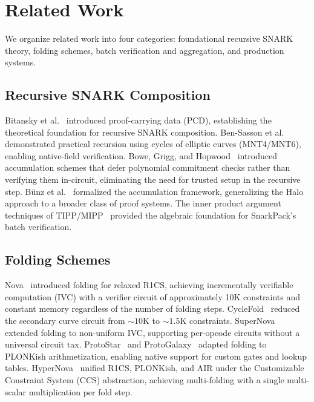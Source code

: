 \section{Related Work}
\label{sec:related}

We organize related work into four categories: foundational recursive
SNARK theory, folding schemes, batch verification and aggregation, and
production systems.

\subsection{Recursive SNARK Composition}

Bitansky et al.~\cite{bitansky-pcd} introduced proof-carrying data
(PCD), establishing the theoretical foundation for recursive SNARK
composition. Ben-Sasson et al.~\cite{ben-sasson-cycle} demonstrated
practical recursion using cycles of elliptic curves (MNT4/MNT6),
enabling native-field verification. Bowe, Grigg, and
Hopwood~\cite{halo} introduced accumulation schemes that defer
polynomial commitment checks rather than verifying them in-circuit,
eliminating the need for trusted setup in the recursive step.
B\"{u}nz et al.~\cite{bunz-accumulation} formalized the accumulation
framework, generalizing the Halo approach to a broader class of
proof systems. The inner product argument techniques of
TIPP/MIPP~\cite{bunz-mipp} provided the algebraic foundation for
SnarkPack's batch verification.

\subsection{Folding Schemes}

Nova~\cite{nova} introduced folding for relaxed R1CS, achieving
incrementally verifiable computation (IVC) with a verifier circuit of
approximately 10K constraints and constant memory regardless of the
number of folding steps. CycleFold~\cite{cyclefold} reduced the
secondary curve circuit from ${\sim}10$K to ${\sim}1.5$K constraints.
SuperNova~\cite{supernova} extended folding to non-uniform IVC,
supporting per-opcode circuits without a universal circuit tax.
ProtoStar~\cite{protostar} and ProtoGalaxy~\cite{protogalaxy} adapted
folding to PLONKish arithmetization, enabling native support for custom
gates and lookup tables. HyperNova~\cite{hypernova} unified R1CS,
PLONKish, and AIR under the Customizable Constraint System (CCS)
abstraction, achieving multi-folding with a single multi-scalar
multiplication per fold step.

